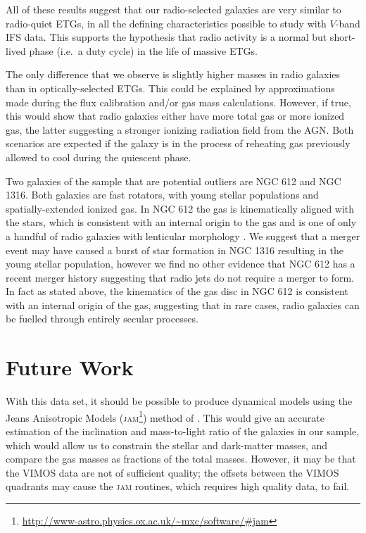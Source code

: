 All of these results suggest that our radio-selected galaxies are very similar to radio-quiet ETGs, in all the defining characteristics possible to study with $V$-band IFS data. This supports the hypothesis that radio activity is a normal but short-lived phase (i.e.\ a duty cycle) in the life of massive ETGs. 

The only difference that we observe is slightly higher  masses in radio galaxies than in optically-selected ETGs. This could be explained by approximations made during the flux calibration and/or gas mass calculations. However, if true, this would show that radio galaxies either have more total gas or more ionized gas, the latter suggesting a stronger ionizing radiation field from the AGN. Both scenarios are expected if the galaxy is in the process of reheating gas previously allowed to cool during the quiescent phase. 

Two galaxies of the sample that are potential outliers are NGC 612 and NGC 1316. Both galaxies are fast rotators, with young stellar populations and spatially-extended ionized gas. In NGC 612 the gas is kinematically aligned with the stars, which is consistent with an internal origin to the gas and is one of only a handful of radio galaxies with lenticular morphology \citep[e.g.][]{Heckman1982, Ledlow1998, Morganti2011}. We suggest that a merger event may have caused a burst of star formation in NGC 1316 resulting in the young stellar population, however we find no other evidence that NGC 612 has a recent merger history suggesting that radio jets do not require a merger to form. In fact as stated above, the kinematics of the gas disc in NGC 612 is consistent with an internal origin of the gas, suggesting that in rare cases, radio galaxies can be fuelled through entirely secular processes. 


\section{Future Work}
	\label{sec:future}
	With this data set, it should be possible to produce dynamical models using the Jeans Anisotropic Models (\textsc{jam}\footnote{\url{http://www-astro.physics.ox.ac.uk/~mxc/software/\#jam}}) method of \citet{Cappellari2008}. This would give an accurate estimation of the inclination and mass-to-light ratio of the galaxies in our sample, which would allow us to constrain the stellar and dark-matter masses, and compare the gas masses as fractions of the total masses. However, it may be that the VIMOS data are not of sufficient quality; the offsets between the VIMOS quadrants may cause the \textsc{jam} routines, which requires high quality data, to fail. 

